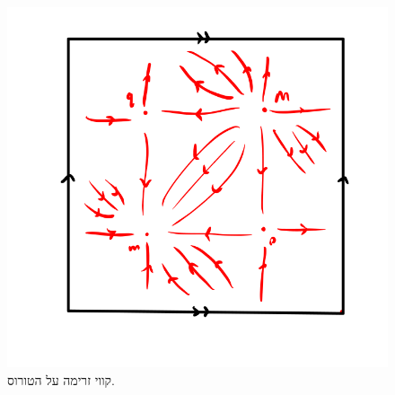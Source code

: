 \documentclass[a4paper,10pt,twoside,openany]{book}
\begin{document}
\begin{figure}
\centering
\includegraphics[scale=0.5]{sources/5.6}
\caption{קווי זרימה על הטורוס.}
\label{5.6}
\end{figure}

\end{document}
